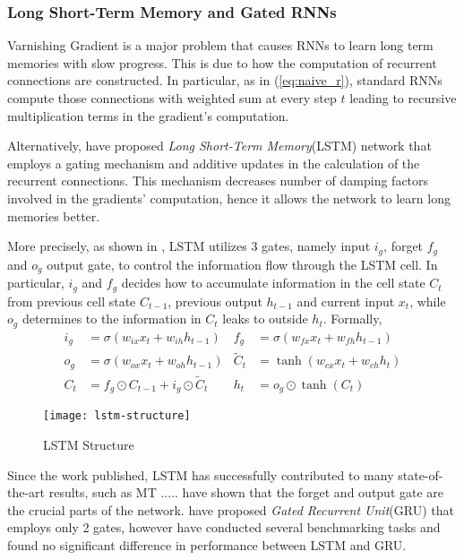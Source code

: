 \subsubsection{Long Short-Term Memory and Gated RNNs}
Varnishing Gradient is a major problem that causes RNNs to learn long term memories with slow progress. This is due to how the computation of recurrent connections are constructed. In particular, as in (\ref{eq:naive_r}), standard RNNs compute those connections with weighted sum at every step $t$ leading to recursive multiplication terms in the gradient's computation.

Alternatively,\cite{HochreiterLongshorttermmemory1997} have proposed \textit{Long Short-Term Memory}(LSTM) network that employs a gating mechanism and additive updates in the calculation of the recurrent connections. This mechanism decreases number of damping factors involved in the gradients' computation, hence it allows the network to learn long memories better.

More precisely, as shown in \addfigure{\ref{fig:lstm_structure}}, LSTM utilizes 3 gates, namely input $i_g$, forget $f_g$ and $o_g$ output gate, to control the information flow through the LSTM cell. In particular, $i_g$ and $f_g$ decides how to accumulate information in the cell state $C_t$ from previous cell state $C_{t-1}$, previous output $h_{t-1}$ and current input $x_t$, while $o_g$ determines to the information in $C_t$ leaks to outside $h_t$. Formally, 
\begin{align}
	i_g &= \sigma( w_{ix} x_t + w_{ih} h_{t-1} )  &  	f_g &= \sigma( w_{fx} x_t + w_{fh} h_{t-1} )\\
	o_g &= \sigma( w_{ox} x_t + w_{oh} h_{t-1} ) & \widetilde{C}_t &= \tanh(w_{cx} x_t + w_{ch} h_t) \\
	C_t &= f_g \odot C_{t-1} + i_g \odot \widetilde{C}_t & h_{t} &= o_g \odot\tanh(C_t)
\end{align}


\begin{figure}[h]
\centering
\texttt{[image: lstm-structure]}
\caption{LSTM Structure} %

\label{fig:lstm_structure} 
\end{figure}

Since the work published, LSTM has successfully contributed to many state-of-the-art results, such as MT ..... \cite{GreffLSTMsearchspace2017} have shown that the forget and output gate are the crucial parts of the network.  \cite{ChoLearningPhraseRepresentations2014a} have proposed \textit{Gated Recurrent Unit}(GRU) that employs only 2 gates, however \cite{Jozefowiczempiricalexplorationrecurrent2015a} have conducted several benchmarking tasks and found no significant difference in performance between LSTM and GRU. 